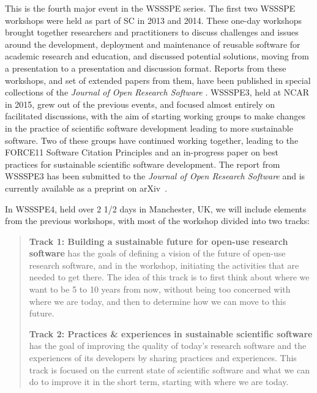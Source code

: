 \documentclass[11pt]{article}
\begin{document}
This is the fourth major event in the WSSSPE series. The first two WSSSPE workshops were held as part of SC in 2013 and 2014. These one-day workshops brought together researchers and practitioners to discuss challenges and issues around the development, deployment and maintenance of reusable software for academic research and education, and discussed potential solutions, moving from a presentation to a presentation and discussion format.  Reports from these workshops, and set of extended papers from them, have been published in special collections of the \textit{Journal of Open Research Software} \cite{WSSSPE1-collection, WSSSPE2-collection, WSSSPE1, WSSSPE2}.
WSSSPE3, held at NCAR in 2015, grew out of the previous events, and focused almost entirely on facilitated discussions, with the aim of starting working groups to make changes in the practice of scientific software development leading to more sustainable software. Two of these groups have continued
working together, leading to the FORCE11 Software Citation Principles and an in-progress paper
on best practices for sustainable scientific software development.  The report from WSSSPE3 has been submitted to the \textit{Journal of Open Research Software} and is currently available as a preprint on arXiv~\cite{WSSSPE3}.

In WSSSPE4, held over 2 1/2 days in Manchester, UK, we will include elements from the
previous workshops, with most of the workshop divided into two tracks:

\begin{quote}
{\bf Track 1: Building a sustainable future for open-use research software} has the goals of defining a vision of the future of open-use research software, and in the workshop, initiating the activities that are needed to get there.  The idea of this track is to first think about where we want to be 5 to 10 years from now, without being too concerned with where we are today, and then to determine how we can move to this future.

{\bf Track 2: Practices \& experiences in sustainable scientific software} has the goal of improving the quality of today's research software and the experiences of its developers by sharing practices and experiences.  This track is focused on the current state of scientific software and what we can do to improve it in the short term, starting with where we are today.
\end{quote}
\end{document}

